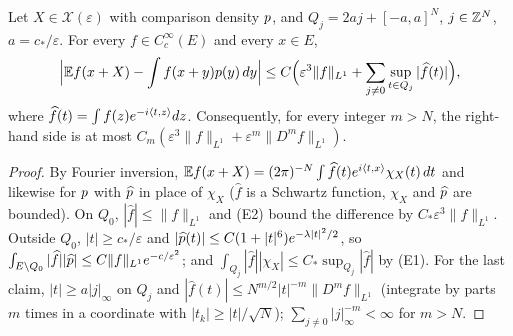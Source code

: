\begin{lemma}\label{lem:test}
Let $X\in\mathcal X(\varepsilon)$ with comparison density $p$, and $Q_j=2aj+[-a,a]^N$, $j\in\mathbb{Z}^N$, $a=c_\ast/\varepsilon$.
For every $f\in C_c^\infty(E)$ and every $x\in E$,
\begin{equation}\label{eq:test}
\Big|\mathbb{E} f(x+X)-\int f(x+y)p(y)\,dy\Big|\le C\Big(\varepsilon^3\|f\|_{L^1}+\sum_{j\ne0}\sup_{t\in Q_j}|\widehat f(t)|\Big),
\end{equation}
where $\widehat f(t)=\int f(z)e^{-i\langle t, z\rangle}dz$. Consequently, for every integer $m>N$,
the right-hand side is at most $C_m(\varepsilon^3\|f\|_{L^1}+\varepsilon^m\|D^mf\|_{L^1})$.
\end{lemma}
\begin{proof}
By Fourier inversion, $\mathbb{E} f(x+X)=(2\pi)^{-N}\int\widehat f(t)e^{i\langle t, x\rangle}\chi_X(t)\,dt$ and likewise for $p$ with
$\widehat{p}$ in place of $\chi_X$ ($\widehat f$ is a Schwartz function, $\chi_X$ and $\widehat{p}$ are bounded). On
$Q_0$, $|\widehat f|\le\|f\|_{L^1}$ and \textup{(E2)} bound the difference by $C_\ast\varepsilon^3\|f\|_{L^1}$. Outside
$Q_0$, $|t|\ge c_\ast/\varepsilon$ and $|\widehat{p}(t)|\le C(1+|t|^6)e^{-\lambda|t|^2/2}$, so
$\int_{E\setminus Q_0}|\widehat f||\widehat{p}|\le C\|f\|_{L^1}e^{-c/\varepsilon^2}$; and
$\int_{Q_j}|\widehat f||\chi_X|\le C_\ast\sup_{Q_j}|\widehat f|$ by \textup{(E1)}. For the last claim, $|t|\ge a|j|_\infty$
on $Q_j$ and $|\widehat f(t)|\le N^{m/2}|t|^{-m}\|D^mf\|_{L^1}$ (integrate by parts $m$ times in a coordinate with
$|t_k|\ge|t|/\sqrt N$); $\sum_{j\ne0}|j|_\infty^{-m}<\infty$ for $m>N$.
\end{proof}

